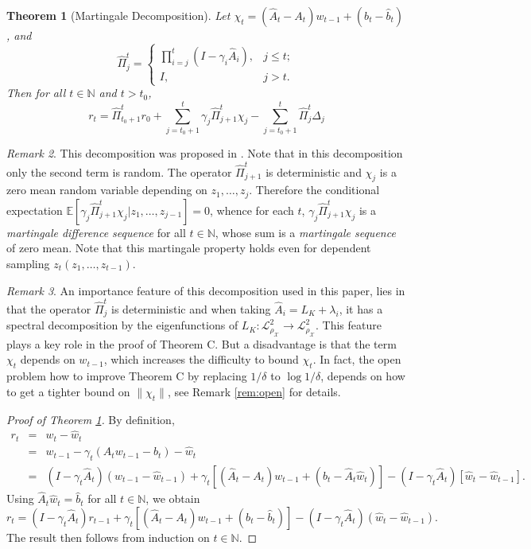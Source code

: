 \documentclass[twoside,11pt]{amsart}
\theoremstyle{theorem}
\newtheorem{thm}{Theorem}[section]
\theoremstyle{definition}
\theoremstyle{remark}
\newtheorem{rem}[thm]{Remark}
\newcommand{\DS}{\displaystyle}
\def\E{{\mathbb E}}        %
\def\L{{\mathscr L}}
\def\L2{{\mathscr L}^2_{\rho_\X}}
\def\A{\hat{A}}
\def\b{\hat{b}}
\def\w{\hat{w}}
\def\X{{\mathscr X}}
\def\PPi{{\hat{\Pi}}}
\def\N{{\mathbb N}}
\def\t{t_0}
\def\la{\lambda}
\begin{document}
\begin{thm}[Martingale Decomposition] \label{thm:mart} Let $\chi_t=(\A_t - A_t) w_{t-1} +(b_t - \b_t)$, and
\begin{equation*} 
\PPi_j^t=
\left\{
\begin{array}{lr}
\DS \prod_{i=j}^t \left( I - \gamma_i  \A_i  \right), & j\leq t; \\
I, & j>t.
\end{array}
\right.
\end{equation*}
Then for all $t\in \N$ and $t>t_0$,
\begin{equation} \label{eq:mart}
r_{t} = \PPi_{\t+1}^t r_0 + \sum_{j=\t+1}^t \gamma_j \PPi_{j+1}^t \chi_j - \sum_{j=\t+1}^t \PPi_{j}^t \Delta_j 
\end{equation}
\end{thm}

\begin{rem}
This decomposition was proposed in \cite{Yao05}. 
Note that in this decomposition only the second term is random. The operator $\PPi_{j+1}^t$ is deterministic and $\chi_j$
is a zero mean random variable depending on $z_1,\ldots, z_j$. Therefore the conditional expectation
$\E[\gamma_j \PPi_{j+1}^t \chi_j|z_1,\ldots,z_{j-1}]=0 $, whence for each $t$, $\gamma_j \PPi_{j+1}^t \chi_j$ is a 
\emph{martingale difference sequence} for all $t\in \N$, whose sum is a \emph{martingale sequence} of zero mean. 
Note that this martingale property holds even for dependent sampling $z_t(z_1,\ldots,z_{t-1})$. 
\end{rem}

\begin{rem}
An importance feature of this decomposition used in this paper, lies in that the operator $\PPi_j^t$ is deterministic and when taking $\A_i = L_K+\la_i$, it
has a spectral decomposition by the eigenfunctions of $L_K:\L2\to \L2$. This feature plays a key role in the proof of Theorem C. 
But a disadvantage is that the term $\chi_t$ depends on $w_{t-1}$, which increases the difficulty to bound $\chi_t$. 
In fact, the open problem how to improve Theorem C by replacing $1/\delta$ to $\log1/\delta$, depends on how to get a tighter
bound on $\|\chi_t\|$, see Remark \ref{rem:open} for details. 
\end{rem}

\begin{proof}[Proof of Theorem \ref{thm:mart}] By definition,
\begin{eqnarray*}
r_{t} & = & w_{t}-\w_{t} \\
& = & w_{t-1} - \gamma_t (A_t w_{t-1} - b_t) - \w_{t} \\
& = & (I - \gamma_t \A_t)(w_{t-1} - \w_{t-1}) + \gamma_t [(\A_t-A_t) w_{t-1} + (b_t - \A_t \w_t  )] - (I-\gamma_t \A_t) [\w_t - \w_{t-1}].
\end{eqnarray*}
Using $\A_t \w_t = \b_t$ for all $t\in \N$, we obtain
\begin{equation}
r_{t} = (I-\gamma_t \A_t) r_{t-1} + \gamma_t [(\A_t - A_t) w_{t-1} +(b_t - \b_t)] - (I-\gamma_t \A_t) (\w_{t}-\w_{t-1}). 
\end{equation}
The result then follows from induction on $t\in \N$. 
\end{proof}
\end{document}
